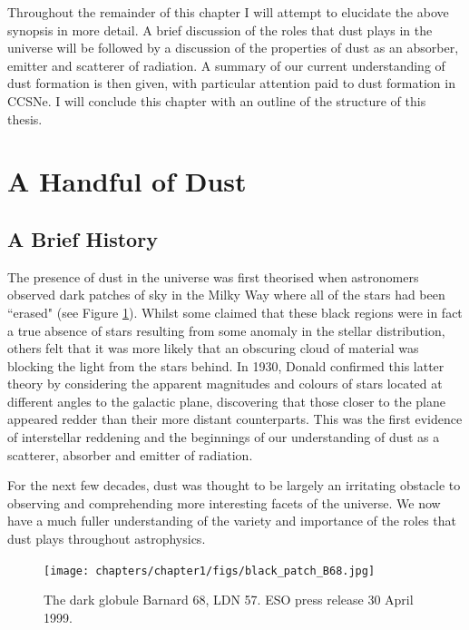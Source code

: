Throughout the remainder of this chapter I will attempt to elucidate the above synopsis in more detail.  A brief discussion of the roles that dust plays in the universe will be followed by a discussion of the properties of dust as an absorber, emitter and scatterer of radiation.  A summary of our current understanding of dust formation is then given, with particular attention paid to dust formation in CCSNe.  I will conclude this chapter
with an outline of the structure of this thesis.


\section{A Handful of Dust}


\subsection{A Brief History}

The presence of dust in the universe was first theorised when astronomers observed dark patches of sky in the Milky Way where all of the stars had been ``erased" (see Figure \ref{intro:fig:dustpatch}).  Whilst some claimed that these black regions were in fact a true absence of stars resulting from some anomaly in the stellar distribution, others felt that it was more likely that an obscuring cloud of material was blocking the light from the stars behind.  In 1930, Donald \citeauthor{Trumpler1930} confirmed this latter theory by considering the apparent magnitudes and colours of stars located at different angles to the galactic plane, discovering that those closer to the plane appeared redder than their more distant counterparts.  This was the first evidence of interstellar reddening and the beginnings of our understanding of dust as a scatterer, absorber and emitter of radiation.

For the next few decades, dust was thought to be largely an irritating obstacle to observing and comprehending more interesting facets of the universe.  We now have a much fuller understanding of the variety and importance of the roles that dust plays throughout astrophysics.

\begin{figure}
\centering
\texttt{[image: chapters/chapter1/figs/black\_patch\_B68.jpg]}
\caption{The dark globule Barnard 68, LDN 57.  ESO press release 30 April 1999.}
\label{intro:fig:dustpatch}
\end{figure}

